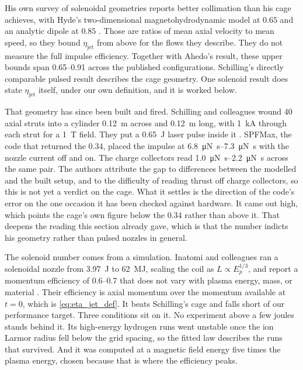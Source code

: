 \documentclass{article}
\begin{document}
His own survey of solenoidal geometries reports better collimation than his cage achieves, with Hyde's two-dimensional magnetohydrodynamic model at $0.65$ and an analytic dipole at $0.85$ \cite{hyde1983laserfusion_rocket,schilling2022nozzle}. Those are ratios of mean axial velocity to mean speed, so they bound $\eta_{\mathrm{jet}}$ from above for the flows they describe. They do not measure the full impulse efficiency. Together with Ahedo's result, these upper bounds span \numrange{0.65}{0.91} across the published configurations. Schilling's directly comparable pulsed result describes the cage geometry. One solenoid result does state $\eta_{\mathrm{jet}}$ itself, under our own definition, and it is worked below.

That geometry has since been built and fired. Schilling and colleagues wound 40 axial struts into a cylinder \SI{0.12}{\meter} across and \SI{0.12}{\meter} long, with \SI{1}{\kilo\ampere} through each strut for a \SI{1}{\tesla} field. They put a \SI{0.65}{\joule} laser pulse inside it \cite{schilling2024subscale}. SPFMax, the code that returned the $0.34$, placed the impulse at \SIrange{6.8}{7.3}{\micro\newton\second} with the nozzle current off and on. The charge collectors read \SIrange{1.0}{2.2}{\micro\newton\second} across the same pair. The authors attribute the gap to differences between the modelled and the built setup, and to the difficulty of reading thrust off charge collectors, so this is not yet a verdict on the cage. What it settles is the direction of the code's error on the one occasion it has been checked against hardware. It came out high, which points the cage's own figure below the $0.34$ rather than above it. That deepens the reading this section already gave, which is that the number indicts his geometry rather than pulsed nozzles in general.

The solenoid number comes from a simulation. Inatomi and colleagues ran a solenoidal nozzle from \SI{3.97}{\joule} to \SI{62}{\mega\joule}, scaling the coil as $L \propto E_p^{1/3}$, and report a momentum efficiency of \numrange{0.6}{0.7} that does not vary with plasma energy, mass, or material \cite{inatomi2023energy}. Their efficiency is axial momentum over the momentum available at $t=0$, which is \autoref{eq:eta_jet_def}. It beats Schilling's cage and falls short of our performance target. Three conditions sit on it. No experiment above a few joules stands behind it. Its high-energy hydrogen runs went unstable once the ion Larmor radius fell below the grid spacing, so the fitted law describes the runs that survived. And it was computed at a magnetic field energy five times the plasma energy, chosen because that is where the efficiency peaks.
\end{document}
